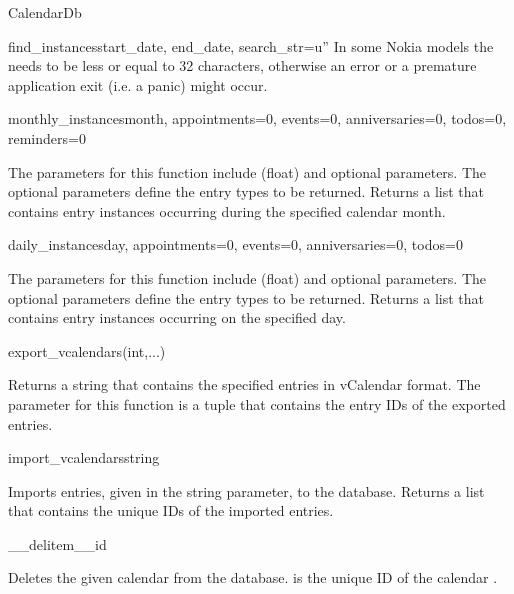\begin{classdesc*}{CalendarDb}
\begin{methoddesc}[CalendarDb]{find_instances}{start_date, end_date, search_str=u''}
In some Nokia models the  needs to be less or equal to 32 
characters, otherwise an error  or a premature application 
exit (i.e. a panic) might occur.
\end{methoddesc}

\begin{methoddesc}[CalendarDb]{monthly_instances}{month, appointments=0, events=0, anniversaries=0, todos=0, reminders=0}

The parameters for this function include  (float) and 
optional parameters. The optional parameters define the entry types to be 
returned. Returns a list that contains entry instances occurring during the 
specified calendar month.

\end{methoddesc}

\begin{methoddesc}[CalendarDb]{daily_instances}{day, appointments=0, events=0, anniversaries=0, todos=0}

The parameters for this function include  (float) and 
optional parameters. The optional parameters define the entry types to be 
returned. Returns a list that contains entry instances occurring on the 
specified day.

\end{methoddesc}

\begin{methoddesc}[CalendarDb]{export_vcalendars}{(int,...)}

Returns a  string that contains the specified entries in 
vCalendar format. The parameter for this function is a tuple that contains 
the entry IDs of the exported entries.

\end{methoddesc}

\begin{methoddesc}[CalendarDb]{import_vcalendars}{string}

Imports  entries, given in the string parameter, to the 
database. Returns a list that contains the unique IDs of the imported 
entries.

\end{methoddesc}

\begin{methoddesc}[CalendarDb]{__delitem__}{id}

Deletes the given calendar  from the database.  is the 
unique ID of the calendar .


\end{methoddesc}
\end{classdesc*}
